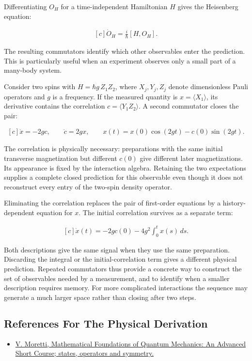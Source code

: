 \documentclass[11pt,oneside]{book}
\newenvironment{centeredalign}{\[\begin{gathered}[c]}{\end{gathered}\]}
\begin{document}
Differentiating \(O_H\) for a time-independent Hamiltonian \(H\) gives the Heisenberg equation:

\begin{centeredalign}
\dot O_H=\frac{i}{\hbar}[H,O_H].
\end{centeredalign}

The resulting commutators identify which other observables enter the prediction. This is particularly useful when an experiment observes only a small part of a many-body system.

Consider two spins with \(H=\hbar g\,Z_1Z_2\), where \(X_j,Y_j,Z_j\) denote dimensionless Pauli operators and \(g\) is a frequency. If the measured quantity is \(x=\langle X_1\rangle\), its derivative contains the correlation \(c=\langle Y_1Z_2\rangle\). A second commutator closes the pair:

\begin{centeredalign}
\dot x=-2gc,\qquad \dot c=2gx,\qquad
x(t)=x(0)\cos(2gt)-c(0)\sin(2gt).
\end{centeredalign}

The correlation is physically necessary: preparations with the same initial transverse magnetization but different \(c(0)\) give different later magnetizations. Its appearance is fixed by the interaction algebra. Retaining the two expectations supplies a complete closed prediction for this observable even though it does not reconstruct every entry of the two-spin density operator.

Eliminating the correlation replaces the pair of first-order equations by a history-dependent equation for \(x\). The initial correlation survives as a separate term:

\begin{centeredalign}
\dot x(t)=-2g c(0)-4g^2\int_0^t x(s)\,ds.
\end{centeredalign}

Both descriptions give the same signal when they use the same preparation. Discarding the integral or the initial-correlation term gives a different physical prediction. Repeated commutators thus provide a concrete way to construct the set of observables needed by a measurement, and to identify when a smaller description requires memory. For more complicated interactions the sequence may generate a much larger space rather than closing after two steps.

\subsection*{References For The Physical Derivation}
\begin{itemize}
\item \href{https://arxiv.org/abs/1508.06951}{V. Moretti, Mathematical Foundations of Quantum Mechanics: An Advanced Short Course; states, operators and symmetry.}
\end{itemize}
\end{document}
